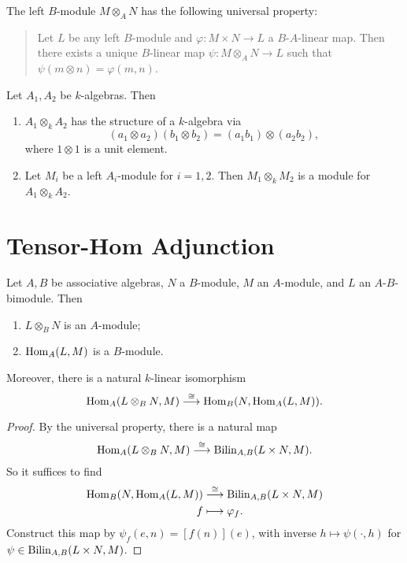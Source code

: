 \begin{prop}
  The left $B$-module $M \otimes_A N$
  has the following universal property:
  \begin{quote}
    Let $L$ be any left $B$-module
    and $\varphi : M \times N \to L$
    a $B$-$A$-linear map. Then there
    exists a unique $B$-linear map
    $\psi : M \otimes_A N \to L$
    such that $\psi(m \otimes n) = \varphi(m, n)$.
  \end{quote}
\end{prop}

\begin{example}
  Let $A_1, A_2$ be $k$-algebras. Then
  \begin{enumerate}
    \item $A_1 \otimes_k A_2$ has
      the structure of a $k$-algebra via
      \[
        (a_1 \otimes a_2)(b_1 \otimes b_2) = (a_1 b_1) \otimes (a_2 b_2),
      \]
      where $1 \otimes 1$ is a unit element.
    \item Let $M_i$ be a left $A_i$-module
      for $i = 1, 2$. Then
      $M_1 \otimes_k M_2$ is a module
      for $A_1 \otimes_k A_2$.
  \end{enumerate}
\end{example}

\section{Tensor-Hom Adjunction}
\begin{prop}
  Let $A, B$ be associative algebras,
  $N$ a $B$-module, $M$ an $A$-module,
  and $L$ an $A$-$B$-bimodule. Then
  \begin{enumerate}
    \item $L \otimes_B N$ is an
      $A$-module;
    \item $\operatorname{Hom}_A(L, M)$ is a
      $B$-module.
  \end{enumerate}
  Moreover, there is a natural
  $k$-linear isomorphism
  \[
    \operatorname{Hom}_A(L \otimes_B N, M) \overset{\cong}{\longrightarrow} \operatorname{Hom}_B(N, \operatorname{Hom}_A(L, M)).
  \]
\end{prop}

\begin{proof}
  By the universal property, there is a
  natural map
  \[
    \operatorname{Hom}_A(L \otimes_B N, M)
    \overset{\cong}{\longrightarrow} \operatorname{Bilin}_{A, B}(L \times N, M).
  \]
  So it suffices to find
  \begin{align*}
    \operatorname{Hom}_B(N, \operatorname{Hom}_A(L, M))
    &\overset{\cong}{\longrightarrow} \operatorname{Bilin}_{A, B}(L \times N, M) \\
    f &\longmapsto \varphi_f.
  \end{align*}
  Construct this map by
  $\psi_f(e, n) = [f(n)](e)$, with
  inverse $h \mapsto \psi(\cdot, h)$
  for $\psi \in \operatorname{Bilin}_{A, B}(L \times N, M)$.
\end{proof}

